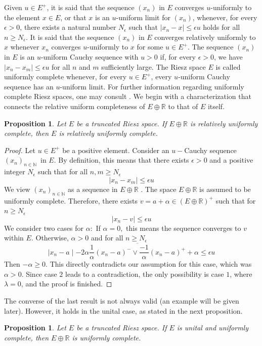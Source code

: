 \documentclass{birkau}
\numberwithin{equation}{section}
\theoremstyle{plain}
\newtheorem{proposition}[theorem]{Proposition}
\theoremstyle{definition}
\begin{document}
	Given $u\in E^{+}$,  it is said that the sequence $\left( x_{n}\right) $ in $E$ converges $u$-uniformly to the element $x\in E$, or that $x$ is an $u$-uniform limit for $\left( x_{n}\right) $,  whenever, for every $ \epsilon >0 $,  there exists a natural number $N_{\epsilon}$ such that $\mid x_{n}-x\mid \leq \epsilon u$ holds for all $n\geq N_{\epsilon}$.  It is said that the sequence $\left( x_{n}\right) $ in $E$ converges relatively uniformly to $x$ whenever $x_{n}$ converges $u$-uniformly to $x$ for some $u\in E^{+}$.
The sequence $\left(x_{n}\right) $ in $E$ is an $u$-uniform Cauchy sequence with $u>0$ if, for every $\epsilon >0$, we have $\mid x_{n}-x_{m}\mid \leq \epsilon u$ for all $n$ and $m$ sufficiently large.  The Riesz space $E$ is called uniformly complete whenever, for every $u\in E^{+}$, every $u$-uniform Cauchy sequence has an $u$-uniform limit. 
For further information regarding uniformly complete Riesz spaces, one may consult	\cite{Riesz1}.
	We begin with a characterization that connects the relative uniform
	completeness of $E \oplus\mathbb{R}$ to that of $E$ itself.
	\begin{proposition}
		Let $E$ be a truncated Riesz space. If $E \oplus\mathbb{R}$ is relatively
		uniformly complete, then $E$ is relatively uniformly complete.
	\end{proposition}
	\begin{proof}
		Let $u\in E^{+}$ be a positive element. Consider an $u-$Cauchy sequence
		$\left(  x_{n}\right)  _{n\in%
			\mathbb{N}
		}$\ in $E.$ By definition,  this means that there exists $\epsilon >0$ and a positive integer $N_{\epsilon}$ such that for all $n,m\geq N_{\epsilon}$
		$$
		\mid x_{n}-x_{m}\mid \leq \epsilon u
		$$
		We view $\left(  x_{n}\right)  _{n\in%
			\mathbb{N}
		}$ as a sequence in  $E\oplus\mathbb{R}$ .  The space $E\oplus\mathbb{R}$ is
		assumed to be uniformly complete. Therefore, there exists $v=a+\alpha\in\left(
		E\oplus%
		\mathbb{R}
		\right)  ^{+}$ such that for $n\geq N_{\epsilon}
		$%
		\[
		\mid x_{n}-v\mid\leq\epsilon u
		\]
		We consider two cases for $\alpha:$ If $\alpha=0,$  this means the sequence
		converges to $v$ within $E.$ Otherwise,  $\alpha >0$  and for all $n\geq N_{\epsilon}
		$%
		\[
		\mid x_{n}-a\mid-2\alpha\overline{\frac{1}{\alpha}\left(  x_{n}-a\right)
			^{-}\vee\frac{-1}{\alpha}\left(  x_{n}-a\right)  ^{+}}+\alpha\leq\epsilon u
		\]
		Then $-\alpha \geq0.$ This directly contradicts our assumption for this case,  which
		was $\alpha>0.$
		Since case $2$ leads to a contradiction,  the only possibility is case $1$,
		where $\lambda =0$,  and the proof is finished.
	\end{proof}
The converse of the last result is not always valid (an example will be given
later). However,  it holds in the unital case, as stated in the next proposition.
\begin{proposition}
	Let $E$ be a truncated Riesz space. If $E$ is unital and uniformly complete,
	then $E\oplus%
	\mathbb{R}
	$ is uniformly complete.
\end{proposition}
\end{document}
